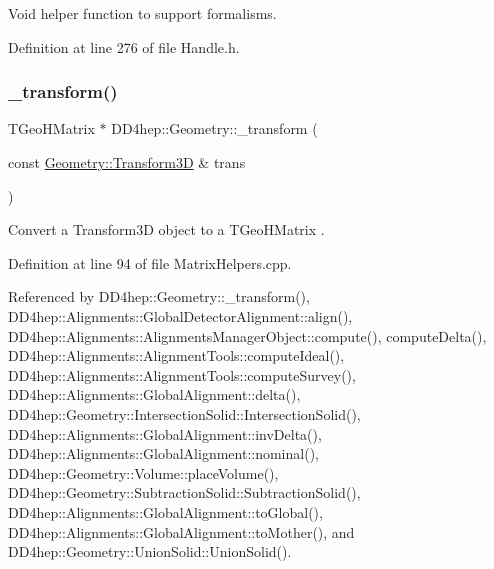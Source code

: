 Void helper function to support formalisms. 



Definition at line 276 of file Handle.\+h.

\hypertarget{group___d_d4_h_e_p___g_e_o_m_e_t_r_y_ga01d65a905944a17404358ea0116d4dd3}{}\label{group___d_d4_h_e_p___g_e_o_m_e_t_r_y_ga01d65a905944a17404358ea0116d4dd3} 
\subsubsection{\texorpdfstring{\+\_\+transform()}{\_transform()}\hspace{0.1cm}{\footnotesize\ttfamily [1/11]}}
{\footnotesize\ttfamily T\+Geo\+H\+Matrix $\ast$ D\+D4hep\+::\+Geometry\+::\+\_\+transform (\begin{DoxyParamCaption}\item[{const \hyperlink{namespace_d_d4hep_1_1_geometry_aeb4c0356d12fd7be49a0aae50514e64b}{Geometry\+::\+Transform3D} \&}]{trans }\end{DoxyParamCaption})}



Convert a Transform3D object to a T\+Geo\+H\+Matrix . 



Definition at line 94 of file Matrix\+Helpers.\+cpp.



Referenced by D\+D4hep\+::\+Geometry\+::\+\_\+transform(), D\+D4hep\+::\+Alignments\+::\+Global\+Detector\+Alignment\+::align(), D\+D4hep\+::\+Alignments\+::\+Alignments\+Manager\+Object\+::compute(), compute\+Delta(), D\+D4hep\+::\+Alignments\+::\+Alignment\+Tools\+::compute\+Ideal(), D\+D4hep\+::\+Alignments\+::\+Alignment\+Tools\+::compute\+Survey(), D\+D4hep\+::\+Alignments\+::\+Global\+Alignment\+::delta(), D\+D4hep\+::\+Geometry\+::\+Intersection\+Solid\+::\+Intersection\+Solid(), D\+D4hep\+::\+Alignments\+::\+Global\+Alignment\+::inv\+Delta(), D\+D4hep\+::\+Alignments\+::\+Global\+Alignment\+::nominal(), D\+D4hep\+::\+Geometry\+::\+Volume\+::place\+Volume(), D\+D4hep\+::\+Geometry\+::\+Subtraction\+Solid\+::\+Subtraction\+Solid(), D\+D4hep\+::\+Alignments\+::\+Global\+Alignment\+::to\+Global(), D\+D4hep\+::\+Alignments\+::\+Global\+Alignment\+::to\+Mother(), and D\+D4hep\+::\+Geometry\+::\+Union\+Solid\+::\+Union\+Solid().

